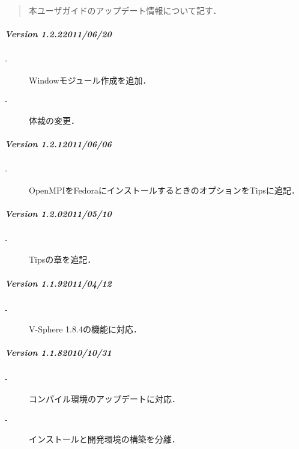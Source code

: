 \begin{abstract}
本ユーザガイドのアップデート情報について記す．
\end{abstract}
%
\label{sec:update info}

%
\subparagraph{Version 1.2.2\hspace{1cm}2011/06/20}
\label{v122}

\begin{description}
\item[-] Windowモジュール作成を追加．
\item[-] 体裁の変更．
\end{description}
\vspace{2mm}

%
\subparagraph{Version 1.2.1\hspace{1cm}2011/06/06}
\label{v121}

\begin{description}
\item[-] OpenMPIをFedoraにインストールするときのオプションをTipsに追記．
\end{description}
\vspace{2mm}

%
\subparagraph{Version 1.2.0\hspace{1cm}2011/05/10}
\label{v120}

\begin{description}
\item[-] Tipsの章を追記．
\end{description}
\vspace{2mm}

%
\subparagraph{Version 1.1.9\hspace{1cm}2011/04/12}
\label{v119}

\begin{description}
\item[-] V-Sphere 1.8.4の機能に対応．
\end{description}
\vspace{2mm}

%
\subparagraph{Version 1.1.8\hspace{1cm}2010/10/31}
\label{v118}

\begin{description}
\item[-] コンパイル環境のアップデートに対応．
\item[-] インストールと開発環境の構築を分離．
\end{description}
\vspace{2mm}

